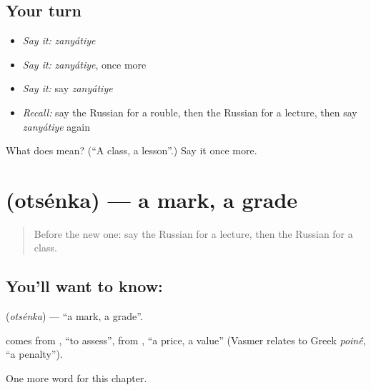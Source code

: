 \subsection*{Your turn}
\begin{itemize}
\raggedright
  \item \emph{Say it:} \emph{zanyátiye}
  \item \emph{Say it:} \emph{zanyátiye}, once more
  \item \emph{Say it:} say \emph{zanyátiye}
  \item \emph{Recall:} say the Russian for a rouble, then the Russian for a lecture, then say \emph{zanyátiye} again
\end{itemize}

\begin{tcolorbox}[breakable,colback=teal!4,colframe=teal!35!black,title={Before you move on}]
What does  mean? (\textquotedblleft{}A class, a lesson\textquotedblright{}.) Say it once more.
\end{tcolorbox}
\section[\texorpdfstring{\ru{оценка} (otsénka)}{оценка (otsénka)}]{ (otsénka) — a mark, a grade}

\label{lesson:RU-C231-otsenka}



\begin{quote}
Before the new one: say the Russian for a lecture, then the Russian for a class.
\end{quote}

\subsection*{You'll want to know: }
\textbf{} (\emph{otsénka}) — \textquotedblleft{}a mark, a grade\textquotedblright{}.

\begin{cousinweb}
\textbf{} comes from \emph{}, \textquotedblleft{}to assess\textquotedblright{}, from \emph{}, \textquotedblleft{}a price, a value\textquotedblright{} (Vasmer relates \emph{} to Greek \emph{poin\'{\={e}}}, \textquotedblleft{}a penalty\textquotedblright{}).
\end{cousinweb}

\begin{grammarlens}[title={What you've built}]
One more word for this chapter.
\end{grammarlens}

